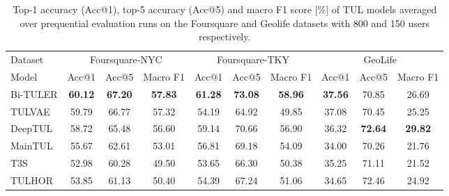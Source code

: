 \documentclass{article} %
\theoremstyle{definition}
\begin{document}
\begin{table}[hb]
    \caption{Top-1 accuracy (Acc@1), top-5 accuracy (Acc@5) and macro F1 score [\%] of TUL models averaged over prequential evaluation runs on the Foursquare and Geolife datasets with 800 and 150 users respectively.}
    \label{tab:models}
    \begin{tabular}{lccccccccc}
        \toprule
        Dataset  & \multicolumn{3}{c}{Foursquare-NYC} & \multicolumn{3}{c}{Foursquare-TKY} & \multicolumn{3}{c}{GeoLife}                                                                                                             \\
        \cmidrule(lr){2-4} \cmidrule(lr){5-7} \cmidrule(lr){8-10}
        Model    & Acc@1                              & Acc@5                              & Macro F1                    & Acc@1           & Acc@5           & Macro F1        & Acc@1           & Acc@5           & Macro F1        \\
        \midrule
        Bi-TULER & \bfseries 60.12                    & \bfseries 67.20                    & \bfseries 57.83             & \bfseries 61.28 & \bfseries 73.08 & \bfseries 58.96 & \bfseries 37.56 & 70.85           & 26.69           \\
        TULVAE   & 59.79                              & 66.77                              & 57.32                       & 54.19           & 64.92           & 49.85           & 37.08           & 70.45           & 25.25           \\
        DeepTUL  & 58.72                              & 65.48                              & 56.60                       & 59.14           & 70.66           & 56.90           & 36.32           & \bfseries 72.64 & \bfseries 29.82 \\
        MainTUL  & 55.67                              & 62.61                              & 53.01                       & 56.81           & 69.18           & 54.09           & 34.00           & 70.26           & 21.76           \\
        T3S      & 52.98                              & 60.28                              & 49.50                       & 53.65           & 66.30           & 50.38           & 35.25           & 71.11           & 21.52           \\
        TULHOR   & 53.85                              & 61.13                              & 50.40                       & 54.39           & 67.24           & 51.06           & 34.65           & 72.46           & 24.92           \\
        \bottomrule
    \end{tabular}
\end{table}
\end{document}

